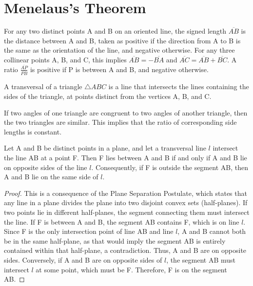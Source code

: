 \chapter{Menelaus's Theorem}

\begin{definition}
    \label{def:Signed_Length}
    For any two distinct points A and B on an oriented line, the signed length $\overline{AB}$ is the distance between A and B, taken as positive if the direction from A to B is the same as the orientation of the line, and negative otherwise. For any three collinear points A, B, and C, this implies $\overline{AB} = -\overline{BA}$ and $\overline{AC} = \overline{AB} + \overline{BC}$. A ratio $\frac{\overline{AP}}{\overline{PB}}$ is positive if P is between A and B, and negative otherwise.
\end{definition}

\begin{definition}
    \label{def:Transversal}
    A transversal of a triangle $\triangle ABC$ is a line that intersects the lines containing the sides of the triangle, at points distinct from the vertices A, B, and C.
\end{definition}

\begin{lemma}
    \label{lem:AA_Similarity}
    If two angles of one triangle are congruent to two angles of another triangle, then the two triangles are similar. This implies that the ratio of corresponding side lengths is constant.
\end{lemma}

\begin{lemma}
    \label{lem:Plane_Separation_Consequence}
    Let A and B be distinct points in a plane, and let a transversal line $l$ intersect the line AB at a point F. Then F lies between A and B if and only if A and B lie on opposite sides of the line $l$. Consequently, if F is outside the segment AB, then A and B lie on the same side of $l$.
\end{lemma}

\begin{proof}
    This is a consequence of the Plane Separation Postulate, which states that any line in a plane divides the plane into two disjoint convex sets (half-planes). If two points lie in different half-planes, the segment connecting them must intersect the line. If F is between A and B, the segment AB contains F, which is on line $l$. Since F is the only intersection point of line AB and line $l$, A and B cannot both be in the same half-plane, as that would imply the segment AB is entirely contained within that half-plane, a contradiction. Thus, A and B are on opposite sides. Conversely, if A and B are on opposite sides of $l$, the segment AB must intersect $l$ at some point, which must be F. Therefore, F is on the segment AB.
\end{proof}

